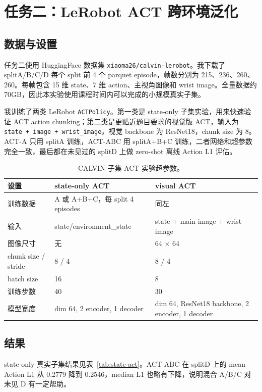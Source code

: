 \documentclass[11pt,a4paper]{ctexart}
\begin{document}
\section{任务二：LeRobot ACT 跨环境泛化}
\subsection{数据与设置}
任务二使用 HuggingFace 数据集 \texttt{xiaoma26/calvin-lerobot}。我下载了 splitA/B/C/D 每个 split 前 4 个 parquet episode，帧数分别为 215、236、260、260。每帧包含 15 维 state、7 维 action、主视角图像和 wrist image。全量数据约 70GB，因此本实验使用课程时间内可以完成的小规模真实子集。

我训练了两类 LeRobot \texttt{ACTPolicy}\cite{lerobot2024,zhao2023act}。第一类是 state-only 子集实验，用来快速验证 ACT action chunking；第二类是更贴近题目要求的视觉版 ACT，输入为 \texttt{state + image + wrist\_image}，视觉 backbone 为 ResNet18，chunk size 为 8。ACT-A 只用 splitA 训练，ACT-ABC 用 splitA+B+C 训练，二者网络和超参数完全一致，最后都在未见过的 splitD 上做 zero-shot 离线 Action L1 评估。

\begin{table}[H]
\centering
\small
\begin{tabularx}{\textwidth}{p{3.4cm}p{3.6cm}X}
\toprule
设置 & state-only ACT & visual ACT \\
\midrule
训练数据 & A 或 A+B+C，每 split 4 episodes & 同左 \\
输入 & state/environment\_state & state + main image + wrist image \\
图像尺寸 & 无 & 64 $\times$ 64 \\
chunk size / stride & 8 / 4 & 8 / 4 \\
batch size & 16 & 8 \\
训练步数 & 40 & 30 \\
模型宽度 & dim 64, 2 encoder, 1 decoder & dim 64, ResNet18 backbone, 2 encoder, 1 decoder \\
\bottomrule
\end{tabularx}
\caption{CALVIN 子集 ACT 实验超参数。}
\label{tab:act-settings}
\end{table}

\subsection{结果}
state-only 真实子集结果见表~\ref{tab:state-act}。ACT-ABC 在 splitD 上的 mean Action L1 从 0.2779 降到 0.2546，median L1 也略有下降，说明混合 A/B/C 对未见 D 有一定帮助。
\end{document}
